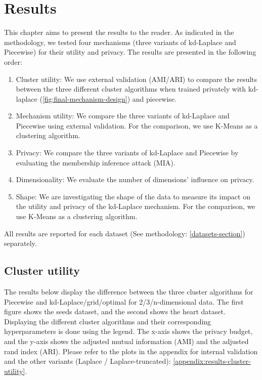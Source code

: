 \chapter{Results}
This chapter aims to present the results to the reader.
As indicated in the methodology, we tested four mechanisms (three variants of kd-Laplace and Piecewise) for their utility and privacy.
The results are presented in the following order:
\begin{enumerate}
    \item Cluster utility: We use external validation (AMI/ARI) to compare the results between the three different cluster algorithms when trained privately with kd-laplace (\ref{fig:final-mechanism-design}) and piecewise.
    \item Mechanism utility: We compare the three variants of kd-Laplace and Piecewise using external validation. For the comparison, we use K-Means as a clustering algorithm.
    \item Privacy: We compare the three variants of kd-Laplace and Piecewise by evaluating the membership inference attack (MIA).
    \item Dimensionality: We evaluate the number of dimensions' influence on privacy.
    \item Shape: We are investigating the shape of the data to measure its impact on the utility and privacy of the kd-Laplace mechanism.
          For the comparison, we use K-Means as a clustering algorithm.
\end{enumerate}
All results are reported for each dataset (See methodology: \ref{datasets-section}) separately.
\newpage
\section{Cluster utility}
The results below display the difference between the three cluster algorithms for Piecewise and kd-Laplace/grid/optimal for 2/3/n-dimensional data.
The first figure shows the seeds dataset, and the second shows the heart dataset. \newline
Displaying the different cluster algorithms and their corresponding hyperparameters is done using the legend.
The x-axis shows the privacy budget, and the y-axis shows the adjusted mutual information (AMI) and the adjusted rand index (ARI).
Please refer to the plots in the appendix for internal validation and the other variants (Laplace / Laplace-truncated): \ref{appendix:results-cluster-utility}.
\newpage
